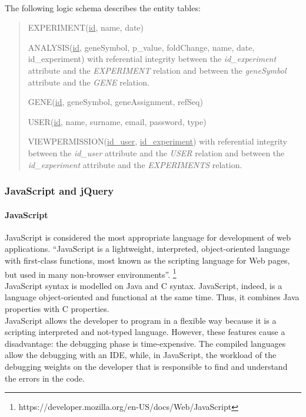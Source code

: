 \documentclass[a4paper]{report}
\begin{document}
\paragraph{}The following logic schema describes the entity tables:
\begin{quote}
\item EXPERIMENT(\underline{id}, name, date) 
\item ANALYSIS(\underline{id}, geneSymbol, p\_value, foldChange, name, date, id\_experiment) with referential integrity between the \emph{id\_experiment} attribute and the \emph{EXPERIMENT} relation and between the \emph{geneSymbol} attribute and the \emph{GENE} relation.
\item GENE(\underline{id}, geneSymbol, geneAssignment, refSeq) 
\item USER(\underline{id}, name, surname, email, password, type) 
\item VIEWPERMISSION(\underline{id\_user}, \underline{id\_experiment})  with referential integrity between the \emph{id\_user} attribute and the \emph{USER} relation and between the \emph{id\_experiment} attribute and the \emph{EXPERIMENTS} relation.
\end{quote}

\subsubsection{JavaScript and jQuery}

\paragraph{JavaScript}
JavaScript is considered the most appropriate language for development of web applications.
 ``JavaScript is a lightweight, interpreted, object-oriented language with first-class functions, most known as the scripting language for Web pages, but used in many non-browser environments''. \footnote{https://developer.mozilla.org/en-US/docs/Web/JavaScript}\\
JavaScript syntax is modelled on Java and C syntax. JavaScript, indeed, is a language object-oriented and functional at the same time. Thus, it combines Java properties with C properties.\\
JavaScript allows the developer to program in a flexible way because it is a scripting interpreted and not-typed language. However, these features cause a disadvantage: the debugging phase is time-expensive. The compiled languages allow the debugging with an IDE, while, in JavaScript, the workload of the debugging weights on the developer that is responsible to find and understand the errors in the code.
\end{document}
